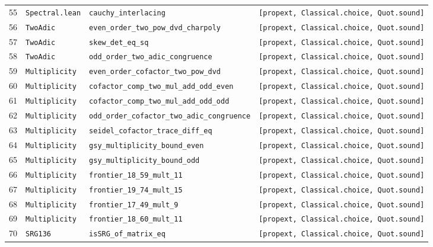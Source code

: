 \documentclass[11pt,reqno]{amsart}
\theoremstyle{definition}
\theoremstyle{remark}
\numberwithin{equation}{section}
\numberwithin{table}{section}
\begin{document}
{\begin{longtable}{@{}r>{\raggedright\arraybackslash}p{1.2in}>{\raggedright\arraybackslash}p{2.55in}>{\raggedright\arraybackslash}p{1.85in}@{}}
55 & \nolinkurl{Spectral.lean} & \nolinkurl{cauchy_interlacing} & \texttt{[propext, Classical.choice, Quot.sound]} \\
56 & \nolinkurl{TwoAdic} & \nolinkurl{even_order_two_pow_dvd_charpoly} & \texttt{[propext, Classical.choice, Quot.sound]} \\
57 & \nolinkurl{TwoAdic} & \nolinkurl{skew_det_eq_sq} & \texttt{[propext, Classical.choice, Quot.sound]} \\
58 & \nolinkurl{TwoAdic} & \nolinkurl{odd_order_two_adic_congruence} & \texttt{[propext, Classical.choice, Quot.sound]} \\
59 & \nolinkurl{Multiplicity} & \nolinkurl{even_order_cofactor_two_pow_dvd} & \texttt{[propext, Classical.choice, Quot.sound]} \\
60 & \nolinkurl{Multiplicity} & \nolinkurl{cofactor_comp_two_mul_add_odd_even} & \texttt{[propext, Classical.choice, Quot.sound]} \\
61 & \nolinkurl{Multiplicity} & \nolinkurl{cofactor_comp_two_mul_add_odd_odd} & \texttt{[propext, Classical.choice, Quot.sound]} \\
62 & \nolinkurl{Multiplicity} & \nolinkurl{odd_order_cofactor_two_adic_congruence} & \texttt{[propext, Classical.choice, Quot.sound]} \\
63 & \nolinkurl{Multiplicity} & \nolinkurl{seidel_cofactor_trace_diff_eq} & \texttt{[propext, Classical.choice, Quot.sound]} \\
64 & \nolinkurl{Multiplicity} & \nolinkurl{gsy_multiplicity_bound_even} & \texttt{[propext, Classical.choice, Quot.sound]} \\
65 & \nolinkurl{Multiplicity} & \nolinkurl{gsy_multiplicity_bound_odd} & \texttt{[propext, Classical.choice, Quot.sound]} \\
66 & \nolinkurl{Multiplicity} & \nolinkurl{frontier_18_59_mult_11} & \texttt{[propext, Classical.choice, Quot.sound]} \\
67 & \nolinkurl{Multiplicity} & \nolinkurl{frontier_19_74_mult_15} & \texttt{[propext, Classical.choice, Quot.sound]} \\
68 & \nolinkurl{Multiplicity} & \nolinkurl{frontier_17_49_mult_9} & \texttt{[propext, Classical.choice, Quot.sound]} \\
69 & \nolinkurl{Multiplicity} & \nolinkurl{frontier_18_60_mult_11} & \texttt{[propext, Classical.choice, Quot.sound]} \\
70 & \nolinkurl{SRG136} & \nolinkurl{isSRG_of_matrix_eq} & \texttt{[propext, Classical.choice, Quot.sound]} \\

\end{longtable}}
\end{document}
